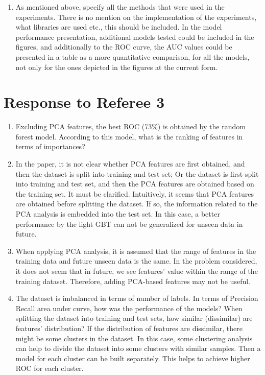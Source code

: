 \documentclass{amsart}[12pt]
\begin{document}
\begin{enumerate}
    \item   {\color{blue} 
        As mentioned above, specify all the methods that were used in the experiments. There is no mention on the implementation of the experiments, what libraries are used etc., this should be included. In the model performance presentation, additional models tested could be included in the figures, and additionally to the ROC curve, the AUC values could be presented in a table as a more quantitative comparison, for all the models, not only for the ones depicted in the figures at the current form.
        }\\
        
\end{enumerate}

\section{Response to Referee 3}

\begin{enumerate}
    \item   {\color{blue} 
        Excluding PCA features, the best ROC (73\%) is obtained by the random forest model. According to this model, what is the ranking of features in terms of importances?
        }\\
    \item   {\color{blue} 
        In the paper, it is not clear whether PCA features are first obtained, and then the dataset is split into training and test set; Or the dataset is first split into training and test set, and then the PCA features are obtained based on the training set. It must be clarified. Intuitively, it seems that PCA features are obtained before splitting the dataset. If so, the information related to the PCA analysis is embedded into the test set. In this case, a better performance by the light GBT can not be generalized for unseen data in future.
        }\\

    \item   {\color{blue} 
        When applying PCA analysis, it is assumed that the range of features in the training data and future unseen data is the same. In the problem considered, it does not seem that in future, we see features' value within the range of the training dataset. Therefore, adding PCA-based features may not be useful. 
        }\\

    \item   {\color{blue} 
        The dataset is imbalanced in terms of number of labels. In terms of Precision Recall area under curve, how was the performance of the models? When splitting the dataset into training and test sets, how similar (dissimilar) are features' distribution? If the distribution of features are dissimilar, there might be some clusters in the dataset. In this case, some clustering analysis can help to divide the dataset into some clusters with similar samples. Then a model for each cluster can be built separately. This helps to achieve higher ROC for each cluster.
        }\\
\end{enumerate}
\end{document}
